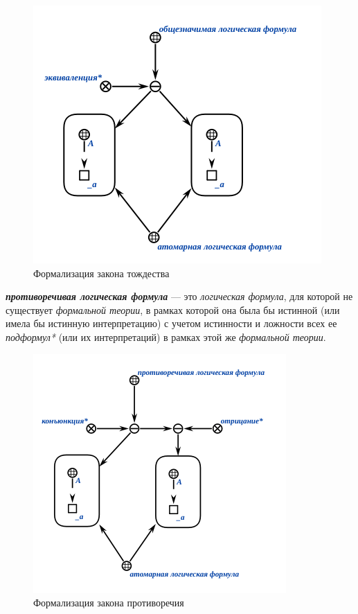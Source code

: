 \begin{figure}[http]
\includegraphics[scale=0.8]{author/part2/figures/logic/valid_formula.png}
\caption{Формализация закона тождества}
\label{fig:valid_formula}
\end{figure}

\begin{SCn}
\end{SCn}
\textbf{\textit{противоречивая логическая формула}} --- это \textit{логическая формула}, для которой не существует \textit{формальной теории}, в рамках которой она была бы истинной (или имела бы истинную интерпретацию) с учетом истинности и ложности всех ее \textit{подформул*} (или их интерпретаций) в рамках этой же \textit{формальной теории}.

\begin{figure}[http]
	\includegraphics[scale=0.8]{author/part2/figures/logic/contradiction_formula.png}
	\caption{Формализация закона противоречия}
	\label{fig:contradiction_formula}
\end{figure}

